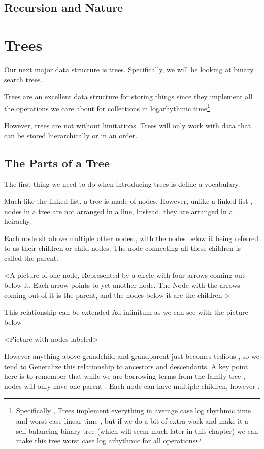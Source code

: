 \documentclass[10pt,a4paper]{book}
\begin{document}
\section{Recursion and Nature}


\chapter{Trees}


Our next major data structure is trees.  Specifically, we will be looking at binary search trees.

Trees are an excellent data structure for storing things since they implement all the operations we care about for collections in logarhythmic time\footnote{Specifically , Trees implement everything in average case log rhythmic time and worst case linear time , but if we do a bit of extra work and make it a self balancing binary tree (which will seem much later in this chapter) we can make this tree worst case log arhythmic for all operations}


However, trees are not without limitations.  Trees will only work with data that can be stored hierarchically or in an order.

\section{The Parts of a Tree}

The first thing we need to do when introducing trees is define a vocabulary.  

Much like the linked list, a tree is made of nodes.
However, unlike a linked list , nodes in a tree are not arranged in a line,
Instead, they are arranged in a heirachy.

Each node sit above multiple other nodes , with the nodes below it being referred to as their children or child nodes.  The node connecting all these children is called the parent.

<A picture of one node, Represented by a circle with four arrows coming out below it. Each arrow points to yet another node.  The Node with the arrows coming out of it is the parent, and the nodes below it are the children >


This relationship can be extended Ad infinitum as we can see with the picture below 


<Picture with nodes labeled>


However anything above grandchild and grandparent just becomes tedious , so we tend to  Generalize this relationship to ancestors and descendants.  A key point here is to remember that while we are borrowing terms from the family tree , nodes will only have one parent . Each node can have multiple children, however .
\end{document}
